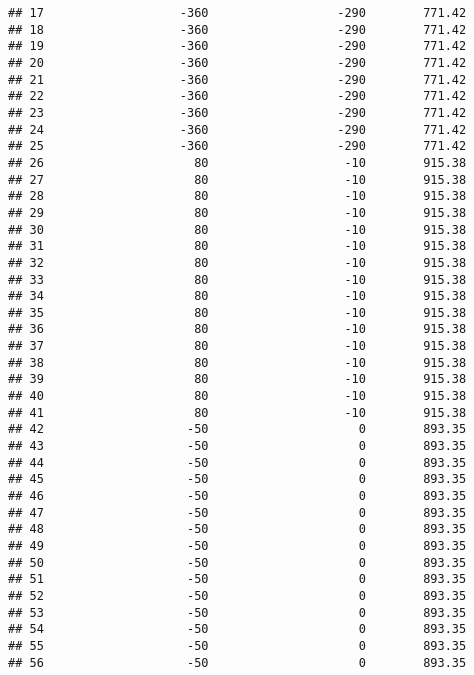 \documentclass[]{article}
\begin{document}
\begin{verbatim}
## 17                   -360                  -290        771.42
## 18                   -360                  -290        771.42
## 19                   -360                  -290        771.42
## 20                   -360                  -290        771.42
## 21                   -360                  -290        771.42
## 22                   -360                  -290        771.42
## 23                   -360                  -290        771.42
## 24                   -360                  -290        771.42
## 25                   -360                  -290        771.42
## 26                     80                   -10        915.38
## 27                     80                   -10        915.38
## 28                     80                   -10        915.38
## 29                     80                   -10        915.38
## 30                     80                   -10        915.38
## 31                     80                   -10        915.38
## 32                     80                   -10        915.38
## 33                     80                   -10        915.38
## 34                     80                   -10        915.38
## 35                     80                   -10        915.38
## 36                     80                   -10        915.38
## 37                     80                   -10        915.38
## 38                     80                   -10        915.38
## 39                     80                   -10        915.38
## 40                     80                   -10        915.38
## 41                     80                   -10        915.38
## 42                    -50                     0        893.35
## 43                    -50                     0        893.35
## 44                    -50                     0        893.35
## 45                    -50                     0        893.35
## 46                    -50                     0        893.35
## 47                    -50                     0        893.35
## 48                    -50                     0        893.35
## 49                    -50                     0        893.35
## 50                    -50                     0        893.35
## 51                    -50                     0        893.35
## 52                    -50                     0        893.35
## 53                    -50                     0        893.35
## 54                    -50                     0        893.35
## 55                    -50                     0        893.35
## 56                    -50                     0        893.35

\end{verbatim}
\end{document}
